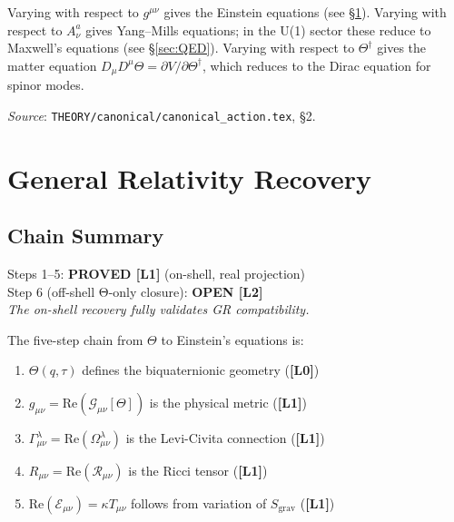 \documentclass[12pt,a4paper]{article}
\newcommand{\Lzero}{\textbf{[L0]}}
\newcommand{\Lone}{\textbf{[L1]}}
\begin{document}
Varying with respect to $g^{\mu\nu}$ gives the Einstein equations (see \S\ref{sec:GR}).
Varying with respect to $A_\nu^a$ gives Yang--Mills equations; in the U(1) sector
these reduce to Maxwell's equations (see \S\ref{sec:QED}).
Varying with respect to $\Theta^\dagger$ gives the matter equation
$D_\mu D^\mu\Theta = \partial V/\partial\Theta^\dagger$,
which reduces to the Dirac equation for spinor modes.

\textit{Source}: \texttt{THEORY/canonical/canonical\_action.tex}, \S2.

\section{General Relativity Recovery}
\label{sec:GR}

\subsection{Chain Summary}

\begin{tcolorbox}[colback=green!5!white,colframe=green!50!black,title=GR Recovery Status]
Steps 1--5: \textbf{PROVED [L1]} (on-shell, real projection)\\
Step 6 (off-shell Θ-only closure): \textbf{OPEN [L2]}\\
\textit{The on-shell recovery fully validates GR compatibility.}
\end{tcolorbox}

The five-step chain from $\Theta$ to Einstein's equations is:

\begin{enumerate}
  \item $\Theta(q,\tau)$ defines the biquaternionic geometry (\Lzero)
  \item $g_{\mu\nu} = \mathrm{Re}(\mathcal{G}_{\mu\nu}[\Theta])$
        is the physical metric (\Lone)
  \item $\Gamma^\lambda_{\mu\nu} = \mathrm{Re}(\Omega^\lambda_{\mu\nu})$
        is the Levi-Civita connection (\Lone)
  \item $R_{\mu\nu} = \mathrm{Re}(\mathcal{R}_{\mu\nu})$
        is the Ricci tensor (\Lone)
  \item $\mathrm{Re}(\mathcal{E}_{\mu\nu}) = \kappa T_{\mu\nu}$ follows from variation of $S_{\mathrm{grav}}$
        (\Lone)
\end{enumerate}
\end{document}
